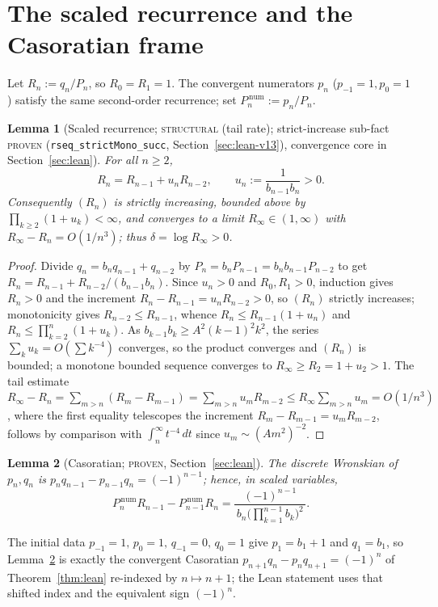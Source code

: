 \documentclass[11pt]{article}
\newtheorem{lemma}{Lemma}
\newcommand{\Rinf}{R_\infty}
\begin{document}
\section{The scaled recurrence and the Casoratian frame}\label{sec:frame}

Let $R_n:=q_n/P_n$, so $R_0=R_1=1$. The convergent numerators $p_n$
($p_{-1}=1,p_0=1$) satisfy the same second-order recurrence; set $P^{\,\mathrm{num}}_n:=p_n/P_n$.

\begin{lemma}[Scaled recurrence; \textsc{structural} (tail rate); strict-increase
sub-fact \textsc{proven} (\texttt{rseq\_strictMono\_succ}, Section~\ref{sec:lean-v13}),
convergence core in Section~\ref{sec:lean}]\label{lem:scaled}
For all $n\ge2$,
\[
  R_n=R_{n-1}+u_n R_{n-2},\qquad u_n:=\frac{1}{b_{n-1}b_n}>0 .
\]
Consequently $(R_n)$ is strictly increasing, bounded above by
$\prod_{k\ge2}(1+u_k)<\infty$, and converges to a limit
$\Rinf\in(1,\infty)$ with $\Rinf-R_n=O(1/n^3)$; thus $\delta=\log\Rinf>0$.
\end{lemma}

\begin{proof}
Divide $q_n=b_nq_{n-1}+q_{n-2}$ by $P_n=b_nP_{n-1}=b_nb_{n-1}P_{n-2}$ to get
$R_n=R_{n-1}+R_{n-2}/(b_{n-1}b_n)$. Since $u_n>0$ and $R_0,R_1>0$, induction gives
$R_n>0$ and the increment $R_n-R_{n-1}=u_nR_{n-2}>0$, so $(R_n)$ strictly increases;
monotonicity gives $R_{n-2}\le R_{n-1}$, whence $R_n\le R_{n-1}(1+u_n)$ and
$R_n\le\prod_{k=2}^n(1+u_k)$. As $b_{k-1}b_k\ge A^2(k-1)^2k^2$, the series
$\sum_k u_k=O(\sum k^{-4})$ converges, so the product converges and $(R_n)$ is
bounded; a monotone bounded sequence converges to $\Rinf\ge R_2=1+u_2>1$. The tail
estimate $\Rinf-R_n=\sum_{m>n}(R_m-R_{m-1})=\sum_{m>n}u_mR_{m-2}\le\Rinf\sum_{m>n}u_m
=O(1/n^3)$, where the first equality telescopes the increment
$R_m-R_{m-1}=u_mR_{m-2}$, follows by comparison with $\int_n^\infty t^{-4}\,dt$ since
$u_m\sim(Am^2)^{-2}$.
\end{proof}

\begin{lemma}[Casoratian; \textsc{proven}, Section~\ref{sec:lean}]\label{lem:caso}
The discrete Wronskian of $p_n,q_n$ is $p_nq_{n-1}-p_{n-1}q_n=(-1)^{n-1}$; hence,
in scaled variables,
\[
  P^{\,\mathrm{num}}_nR_{n-1}-P^{\,\mathrm{num}}_{n-1}R_n
   =\frac{(-1)^{n-1}}{\,b_n\big(\prod_{k=1}^{n-1}b_k\big)^2\,}.
\]
\end{lemma}

\noindent The initial data $p_{-1}{=}1,\,p_0{=}1,\,q_{-1}{=}0,\,q_0{=}1$ give
$p_1{=}b_1{+}1$ and $q_1{=}b_1$, so Lemma~\ref{lem:caso} is exactly the convergent
Casoratian $p_{n+1}q_n-p_nq_{n+1}=(-1)^n$ of Theorem~\ref{thm:lean} re-indexed by
$n\mapsto n+1$; the Lean statement uses that shifted index and the equivalent sign
$(-1)^n$.
\end{document}
